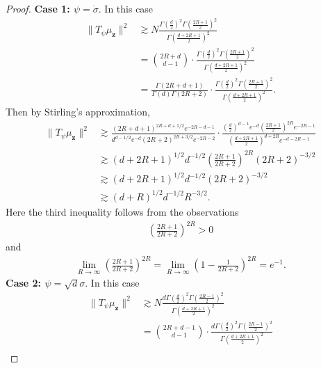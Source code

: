 \documentclass{article}
\theoremstyle{definition}
\def\vz{{\bm{z}}}
\begin{document}
\begin{proof}
    \textbf{Case 1: $\psi = \dot{\sigma}$}. In this case
    \begin{align*}
        \|T_{\psi}\mu_{\vz}\|^2 &\gtrsim N\frac{ \Gamma\left(\frac{d}{2}\right)^2 \Gamma\left(\frac{2R + 1}{2}\right)^2 }{\Gamma\left(\frac{d + 2R + 1}{2}\right)^2 }\\
        &= \binom{2R + d}{d - 1}\cdot \frac{ \Gamma\left(\frac{d}{2}\right)^2 \Gamma\left(\frac{2R + 1}{2}\right)^2 }{\Gamma\left(\frac{d + 2R + 1}{2}\right)^2 }\\
        &= \frac{\Gamma(2R + d + 1) }{\Gamma(d)\Gamma(2R + 2) } \cdot \frac{ \Gamma\left(\frac{d}{2}\right)^2 \Gamma\left(\frac{2R + 1}{2}\right)^2 }{\Gamma\left(\frac{d + 2R + 1}{2}\right)^2 }.
    \end{align*}
    Then by Stirling's approximation,
    \begin{align*}
        \|T_{\psi}\mu_{\vz}\|^2 &\gtrsim \frac{(2R + d + 1)^{2R + d + 1/2}e^{-2R - d - 1 }  }{d^{d -1/2}e^{-d}(2R + 2)^{2R + 3/2}e^{-2R - 2}  } \cdot \frac{\left(\frac{d}{2}\right)^{d - 1}e^{-d}\left(\frac{2R + 1}{2}\right)^{2R} e^{-2R - 1}  }{\left(\frac{d + 2R + 1}{2}\right)^{d + 2R} e^{-d - 2R - 1}  }\\
        &\gtrsim (d + 2R + 1)^{1/2} d^{-1/2}\left(\frac{2R + 1}{2R + 2}\right)^{2R}(2R + 2)^{-3/2}\\
        &\gtrsim (d + 2R + 1)^{1/2}d^{-1/2} (2R + 2)^{-3/2}\\
        &\gtrsim (d + R)^{1/2}d^{-1/2} R^{-3/2}.
    \end{align*}
    Here the third inequality follows from the observations
    \begin{align*}
        \left(\frac{2R + 1}{2R + 2}\right)^{2R} > 0
    \end{align*}
    and
    \begin{align*}
        \lim_{R \to \infty}\left(\frac{2R + 1}{2R + 2}\right)^{2R} = \lim_{R \to \infty}\left(1 - \frac{1}{2R +2}\right)^{2R} = e^{-1}.
    \end{align*}
    \textbf{Case 2: $\psi = \sqrt{d}\sigma$}. In this case
    \begin{align*}
        \|T_{\psi}\mu_{\vz}\|^2 &\gtrsim N\frac{ d \Gamma\left(\frac{d}{2}\right)^2 \Gamma\left(\frac{2R - 1}{2}\right)^2 }{\Gamma\left(\frac{d + 2R + 1}{2}\right)^2 }\\
        &=\binom{2R + d - 1}{d  - 1}\cdot \frac{ d \Gamma\left(\frac{d}{2}\right)^2 \Gamma\left(\frac{2R - 1}{2}\right)^2 }{\Gamma\left(\frac{d + 2R + 1}{2}\right)^2 }\\

\end{align*}
\end{proof}
\end{document}
